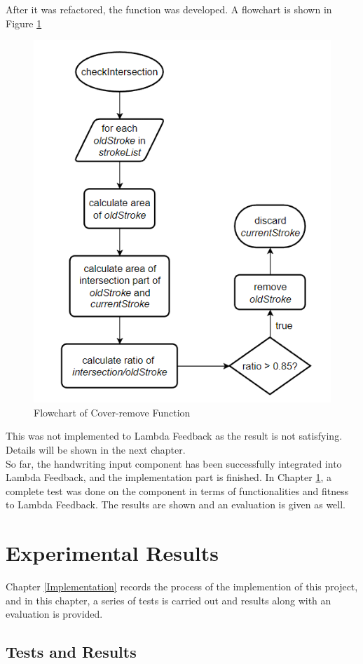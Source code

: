 \documentclass[12pt,twoside]{report}
\begin{document}
After it was refactored, the function was developed. A flowchart is shown in
Figure \ref{fig:flowchart-intersection}
\begin{figure}
    \centering
    \includegraphics[width=0.7\linewidth, frame]{figures/flowchart-intersection.png}
    \caption{Flowchart of Cover-remove Function}
    \label{fig:flowchart-intersection}
\end{figure}

This was not implemented to Lambda Feedback as the result is not satisfying. Details will be shown in the next chapter.
\\

So far, the handwriting input component has been successfully integrated into
Lambda Feedback, and the implementation part is finished. In Chapter
\ref{Results}, a complete test was done on the component in terms of
functionalities and fitness to Lambda Feedback. The results are shown and an
evaluation is given as well.



\chapter{Experimental Results}
\label{Results}
Chapter \ref{Implementation} records the process of the implemention of this project, and in this chapter, a series of tests is carried out and results along with an evaluation is provided.

\section{Tests and Results}
\label{tests-results}
\end{document}
